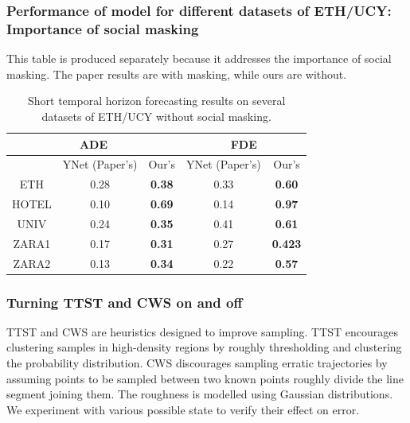 \subsubsection{Performance of model for different datasets of ETH/UCY: Importance of social masking}

This table is produced separately because it addresses the importance of social masking. The paper results are with masking, while ours are without.

\begin{table}[H]
\vspace*{-.1in}
\begin{center}
\begin{tabular}{ |c|c|c|c|c| }
 \hline
 \multicolumn{3}{|c|}{ADE} & \multicolumn{2}{|c|}{FDE}  
 \\
 \hline
  & YNet (Paper's) & Our's & YNet (Paper's) & Our's   \\ 
  \hline
  ETH & 0.28 & \textbf{0.38} & 0.33 & \textbf{0.60} \\ 
 \hline
 HOTEL & 0.10 & \textbf{0.69} & 0.14 & \textbf{0.97} \\ 
 \hline
 UNIV & 0.24 & \textbf{0.35} & 0.41 & \textbf{0.61} \\ 
 \hline
 ZARA1 & 0.17 & \textbf{0.31} & 0.27 & \textbf{0.423}\\ 
 \hline
 ZARA2 & 0.13 & \textbf{0.34} & 0.22 & \textbf{0.57}\\ 
 \hline

\end{tabular}
\bigskip
\caption{Short temporal horizon forecasting results on several datasets of ETH/UCY without social masking.}
\label{eq:result_1}
\end{center}
\vspace*{-.1in}
\end{table}



\subsubsection{Turning TTST and CWS on and off}
TTST and CWS are heuristics designed to improve sampling. TTST encourages clustering samples in high-density regions by roughly thresholding and clustering the probability distribution. CWS discourages sampling erratic trajectories by assuming points to be sampled between two known points roughly divide the line segment joining them. The roughness is modelled using Gaussian distributions. We experiment with various possible state to verify their effect on error.

